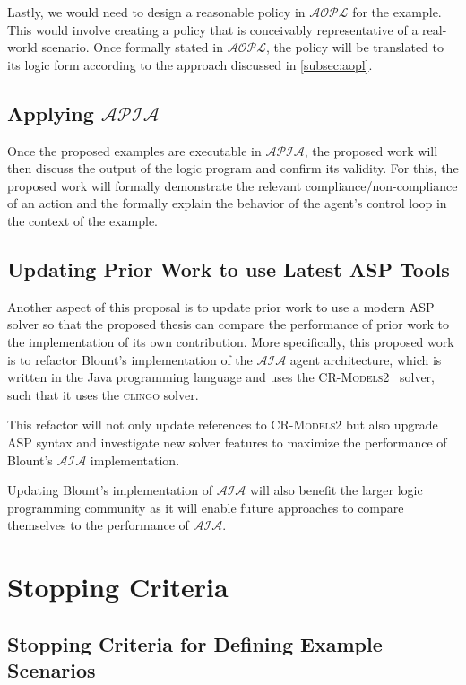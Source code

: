 Lastly, we would need to design a reasonable policy in $\mathcal{AOPL}$ for the example.
This would involve creating a policy that is conceivably representative of a real-world scenario.
Once formally stated in $\mathcal{AOPL}$, the policy will be translated to its logic form according to the approach discussed in \cref{subsec:aopl}.

\subsection{Applying $\mathcal{APIA}$}

Once the proposed examples are executable in $\mathcal{APIA}$, the proposed work will then discuss the output of the logic program and confirm its validity.
For this, the proposed work will formally demonstrate the relevant compliance/non-compliance of an action and the formally explain the behavior of the agent's control loop in the context of the example.

\subsection{Updating Prior Work to use Latest ASP Tools}

Another aspect of this proposal is to update prior work to use a modern ASP solver so that the proposed thesis can compare the performance of prior work to the implementation of its own contribution.
More specifically, this proposed work is to refactor Blount's implementation of the $\mathcal{AIA}$ agent architecture, which is written in the Java programming language and uses the \textsc{CR-Models2}~\citep{balduccini_cr-models_2007} solver, such that it uses the \textsc{clingo} solver.

This refactor will not only update references to \textsc{CR-Models2} but also upgrade ASP syntax and investigate new solver features to maximize the performance of Blount's $\mathcal{AIA}$ implementation.

Updating Blount's implementation of $\mathcal{AIA}$ will also benefit the larger logic programming community as it will enable future approaches to compare themselves to the performance of $\mathcal{AIA}$.

\section{Stopping Criteria}

\subsection{Stopping Criteria for Defining Example Scenarios}

